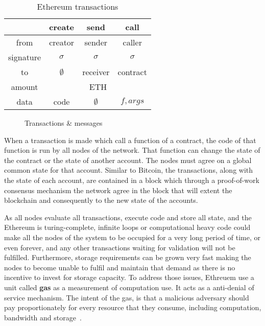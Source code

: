 \begin{table}[!ht]
  \centering
  \begin{tabular}{|c|c|c|c|}
  \hline
   & create & send & call \\ \hline
   from & creator & sender & caller \\ \hline
   signature & $\sigma$ & $\sigma$ & $\sigma$ \\ \hline
   to & $\emptyset$ & receiver & contract \\ \hline
   amount & \multicolumn{3}{c|}{ETH} \\ \hline
   data & code & $\emptyset$ & $f, args$ \\ \hline
  \end{tabular}
  \caption{Ethereum transactions}
  \label{fig:eth_transactions}
\end{table}

\begin{figure}[!ht]
  \centering
  \caption{Transactions \& messages}
  \label{fig:eth_transaction}
\end{figure}

When a transaction is made which call a function of a contract, the code of that function is run by all nodes of the network. That function can change the state of the contract or the state of another account. The nodes must agree on a global common state for that account. Similar to Bitcoin, the transactions, along with the state of each account, are contained in a block which through a proof-of-work consensus mechanism the network agree in the block that will extent the blockchain and consequently to the new state of the accounts.

As all nodes evaluate all transactions, execute code and store all state, and the Ethereum is turing-complete, infinite loops or computational heavy code could make all the nodes of the system to be occupied for a very long period of time, or even forever, and any other transactions waiting for validation will not be fulfilled. Furthermore, storage requirements can be grown very fast making the nodes to become unable to fulfil and maintain that demand as there is no incentive to invest for storage capacity. To address those issues, Ethreuem use a unit called \textbf{gas} as a measurement of computation use. It acts as a anti-denial of service mechanism. The intent of the gas, is that a malicious adversary should pay proportionately for every resource that they consume, including computation, bandwidth and storage~\cite{ethereum_whitepaper}.

